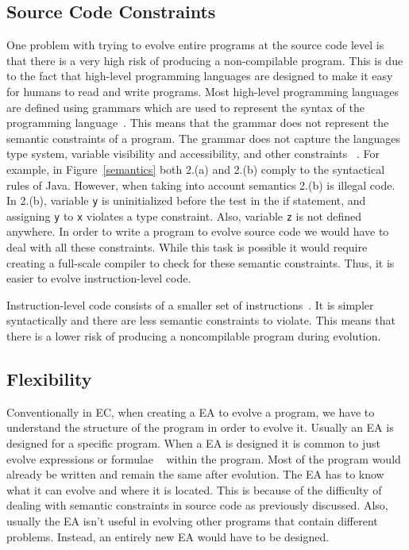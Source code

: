\documentclass{sig-alternate}
\begin{document}
\subsection{Source Code Constraints}
One problem with trying to evolve entire programs at the source code level is that there is a very high risk of producing a non-compilable program. This is due to the fact that high-level programming languages are designed to make it easy for humans to read and write programs. Most high-level programming languages are defined using grammars which are used to represent the syntax of the programming language~\cite{Oracle:2013,Assembly:2010}. This means that the grammar does not represent the semantic constraints of a program. The grammar does not capture the languages type system, variable visibility and accessibility, and other constraints ~\cite{FINCH:2011}. For example, in Figure~\ref{semantics} both 2.(a) and 2.(b) comply to the syntactical rules of Java. However, when taking into account semantics 2.(b) is illegal code. In 2.(b), variable \texttt{y} is uninitialized before the test in the if statement, and assigning \texttt{y} to \texttt{x} violates a type constraint. Also, variable \texttt{z} is not defined anywhere.  In order to write a program to evolve source code we would have to deal with all these constraints. While this task is possible it would require creating a full-scale compiler to check for these semantic constraints. Thus, it is easier to evolve instruction-level code. \par

Instruction-level code consists of a smaller set of instructions~\cite{Assembly:2010}. It is simpler syntactically and there are less semantic constraints to violate. This means that there is a lower risk of producing a noncompilable program during evolution.

\subsection{Flexibility}
Conventionally in EC, when creating a EA to evolve a program, we have to understand the structure of the program in order to evolve it. Usually an EA is designed for a specific program. When a EA is designed it is common to just evolve expressions or formulae ~\cite{FINCH:2011} within the program. Most of the program would already be written and remain the same after evolution. The EA has to know what it can evolve and where it is located. This is because of the difficulty of dealing with semantic constraints in source code as previously discussed. Also, usually the EA isn't useful in evolving other programs that contain different problems. Instead, an entirely new EA would have to be designed.
\end{document}
